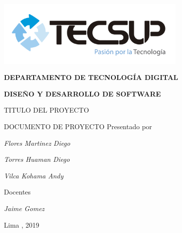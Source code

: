 \begin{titlepage}
	\centering
	\includegraphics[width=0.70\textwidth]{img/logo_tecsup_final}\par\vspace{1cm}
	\vspace{0.30cm}	
	{\scshape\large\bfseries DEPARTAMENTO DE TECNOLOG\'IA DIGITAL \par}
	\vspace{0.60cm}	
	{\scshape\large\bfseries DISEÑO Y DESARROLLO DE SOFTWARE  \par}
	\vspace{2.00cm}		
	{\large\large TITULO DEL PROYECTO \par}
	\vspace{0.60cm}
	{\scshape\large DOCUMENTO DE PROYECTO }
	\vspace{0.60cm}
	\vfill
	Presentado por \par
	{\large\itshape {Flores Martinez Diego}\par}
	{\large\itshape {Torres Huaman Diego}\par}
	{\large\itshape {Vilca Kohama Andy}\par}
	\vspace{0.30cm}
	\vfill
	Docentes \par
	{\large\itshape {Jaime Gomez}}\par
	\vspace{0.30cm}
	\vfill
	{\large Lima , 2019 \par}
\end{titlepage}

